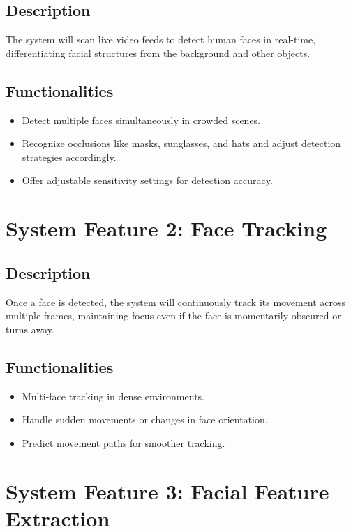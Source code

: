 \documentclass{scrreprt}
\begin{document}
        \subsection{Description}
            The system will scan live video feeds to detect human faces in real-time, differentiating facial structures from the background and other objects.
        \subsection{Functionalities}
            \begin{itemize}
                \item Detect multiple faces simultaneously in crowded scenes.
                \item Recognize occlusions like masks, sunglasses, and hats and adjust detection strategies accordingly.
                \item Offer adjustable sensitivity settings for detection accuracy.                
            \end{itemize}
    
    \section{System Feature 2: Face Tracking}   
        \subsection{Description}
            Once a face is detected, the system will continuously track its movement across multiple frames, maintaining focus even if the face is momentarily obscured or turns away.
        \subsection{Functionalities}
            \begin{itemize}
                \item Multi-face tracking in dense environments.
                \item Handle sudden movements or changes in face orientation.
                \item Predict movement paths for smoother tracking.
                               
            \end{itemize}

    
        \section{System Feature 3: Facial Feature Extraction}   
\end{document}
